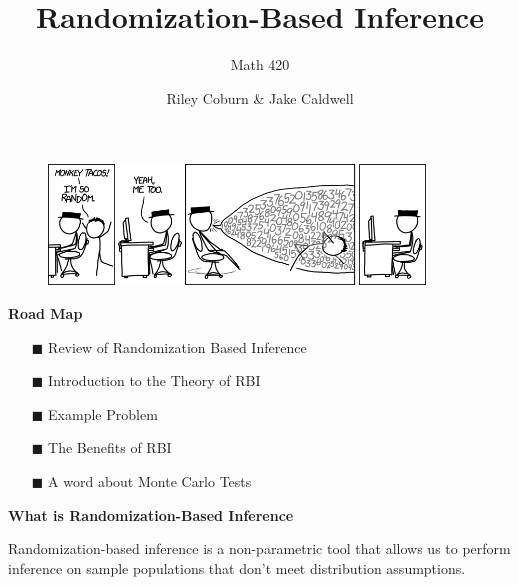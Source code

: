 \documentclass{beamer}
\title{Randomization-Based Inference}
\subtitle{Math 420}
\author{Riley Coburn \& Jake Caldwell}
\institute{Denison University}
\begin{document}
\begin{frame}
\titlepage
\end{frame}

\begin{frame}{}
    \begin{figure}[htp]
        \centering
        \includegraphics[width=10cm]{class9 random.jpg}
    \end{figure}
\end{frame}

\begin{frame}{\textbf{Road Map}}
    \begin{itemize}
    
        \item[$\blacksquare$] Review of Randomization Based Inference
        
        \item[$\blacksquare$] Introduction to the Theory of RBI
        
        \item[$\blacksquare$] Example Problem
        
        \item[$\blacksquare$] The Benefits of RBI
        
        \item[$\blacksquare$] A word about Monte Carlo Tests
        
    \end{itemize}
\end{frame}

\begin{frame}{\textbf{What is Randomization-Based Inference}}
    
    Randomization-based inference is a non-parametric tool that allows us to perform inference on sample populations that don't meet distribution assumptions.
    
\end{frame}
\end{document}
